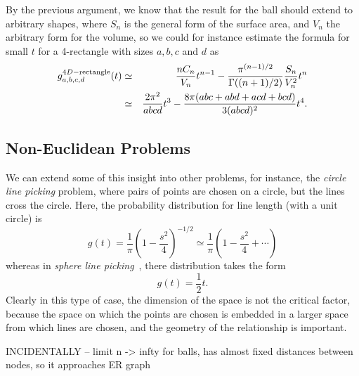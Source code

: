 By the previous argument, we know that the result for the ball should
extend to arbitrary shapes, where $S_n$ is the general form of the
surface area, and $V_n$ the arbitrary form for the volume, so we could
for instance estimate the formula for small $t$ for a 4-rectangle with
sizes $a,b,c$ and $d$ as
\begin{eqnarray}
  g^{4D-{\rm rectangle}}_{a,b,c,d}(t)
 & \simeq  & 
      \frac{n C_n}{V_n} t^{n-1}
    -  \frac{ \pi^{(n-1)/2} }{\Gamma((n+1)/2)}
        \frac{S_n}{ V_n^2} t^{n} \nonumber \\
 & \simeq  & 
      \frac{2 \pi^{2}}{ a b c d} t^{3}
      -  \frac{8 \pi(abc + a b d + a c d + b c d)}{ 3 (a b c d)^2} t^{4}.
\end{eqnarray}




\subsection{Non-Euclidean Problems}

We can extend some of this insight into other problems, for instance,
the {\em circle line picking} problem, where pairs of points are
chosen on a circle, but the lines cross the circle. Here, the
probability distribution for line length (with a unit circle) is
\cite{weisstein:_circle_line_picking}
\begin{equation}
  \label{eq:circle_line_picking}
  g(t) = \frac{1}{\pi} \left(    
           1 - \frac{s^2}{4}
               \right)^{-1/2} 
       \simeq \frac{1}{\pi} \left( 1 - \frac{s^2}{4} + \cdots \right) 
\end{equation}
whereas in {\em sphere line
  picking}~\cite{weisstein:_sphere_line_picking}, there distribution
takes the form
\begin{equation}
  \label{eq:sphere_line_picking_approx}
  g(t) = \frac{1}{2} t.
\end{equation}
Clearly in this type of case, the dimension of the space is not the
critical factor, because the space on which the points are chosen is
embedded in a larger space from which lines are chosen, and the
geometry of the relationship is important.


INCIDENTALLY -- limit n -> infty for balls, has almost fixed distances
between nodes, so it approaches ER graph



